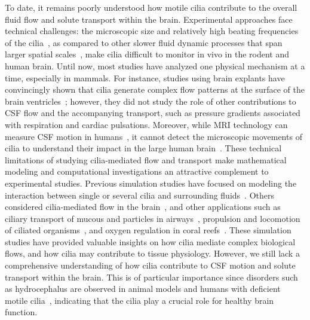 \documentclass{WileyMSP-template}
\begin{document}
To date, it remains poorly understood how motile cilia contribute to 
the overall fluid flow and solute transport within the brain.
Experimental approaches face technical challenges: the microscopic size and relatively 
high beating frequencies of the cilia~\cite{ocallaghan2012analysis, mahuzier2018ependymal,
Jeong2022MeasurementTelencephalon, Olstad2019CiliaryDevelopment, spassky2013motile, DGama2021Diversity},
as compared to other slower fluid dynamic processes that span larger
spatial scales~\cite{Vinje2019RespiratoryMeasurements, eide2024functional, fultz2019coupled, mestre2018flow},
make cilia difficult to monitor in vivo in the rodent and human brain.
Until now, most studies have analyzed one physical mechanism at a time, especially in mammals.
For instance, studies using brain explants have convincingly shown
that cilia generate complex flow patterns at the surface of the brain
ventricles~\cite{Faubel2016Cilia-basedVentricles, Sawamoto2006NewBrain, ibanez2003beat};
however, they did not study the role of other contributions to CSF
flow and the accompanying transport, such as pressure
gradients associated with respiration and cardiac pulsations. Moreover, while MRI technology
can measure CSF motion in humans~\cite{feinberg1987human, battal2011cerebrospinal,
yamada2015current}, it cannot detect the microscopic
movements of cilia to understand their impact in the large human
brain~\cite{Siyahhan2014FlowVentricles}. 
These technical limitations of studying cilia-mediated flow and transport make 
mathematical modeling and computational investigations an attractive complement to experimental
studies. Previous simulation studies have focused on modeling the interaction
between single or several cilia and surrounding
fluids~\cite{Guo2020SimulatingGeometries, Ruvalcaba2021NumericalTree, Smith2009MathematicalFluids,
Cui2019NumericalMethod, Cui2022AFlow}.
Others considered cilia-mediated flow in the brain~\cite{Siyahhan2014FlowVentricles,
Yoshida2022EffectVentricles, Salman2022ComputationalEmbryo, Thouvenin2020OriginCanal},
and other applications such as ciliary transport of mucous and particles in
airways~\cite{Fulford1986Muco-ciliaryLung, Ramirez-SanJuan2020Multi-scaleArrays, roth2025structure},
propulsion and locomotion of ciliated organisms~\cite{BLAKE1974MechanicsMotion,
Jahn1972LocomotionProtozoa, Brennen1977FluidFlagella}, and
oxygen regulation in coral reefs~\cite{Pacherres2022CiliaryProduction}.
These simulation studies have provided valuable insights on how cilia mediate complex
biological flows, and how cilia may contribute to tissue physiology.
However, we still lack a comprehensive understanding of how
cilia contribute to CSF motion and solute transport within the brain.
This is of particular importance since disorders such as hydrocephalus are observed
in animal models and humans with deficient motile cilia~\cite{Afzelius2004CiliaRelatedDiseases,
Olstad2019CiliaryDevelopment, Mitchison2017Motile, Ibanez-Tallon2002LossHydrocephalus},
indicating that the cilia play a crucial role for healthy brain function. 
\end{document}
